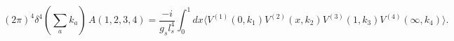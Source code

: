 \begin{equation}
(2\pi )^{4}\delta ^{4}(\sum _{a}k_{a})\,
A(1,2,3,4)=\frac{-i}{g_{s}l_{s}^{4}}\int ^{1}_{0}dx\langle
V^{(1)}(0,k_{1})V^{(2)}(x,k_{2})V^{(3)}(1,k_{3})V^{(4)}
(\infty ,k_{4})\rangle .
\end{equation}

